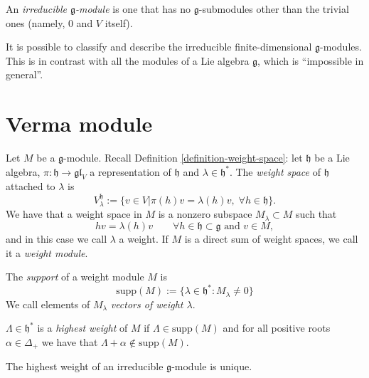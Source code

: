 \begin{definition}
\label{definition-irreducible-g-module}
An {\it irreducible $\mathfrak{g}$-module} is
one that has
no $\mathfrak{g}$-submodules other than the
trivial ones (namely, 0 and $V$ itself).
\end{definition}

It is possible to classify and describe the
irreducible finite-dimensional
$\mathfrak{g}$-modules. This is in contrast
with all the modules of a Lie algebra
$\mathfrak{g}$,
which is ``impossible in general''.

\section{Verma module}
\label{section-Verma-module}

Let $M$ be a $\mathfrak{g}$-module. Recall
Definition \ref{definition-weight-space}:
let $\mathfrak{h}$ be a Lie algebra,
$\pi:\mathfrak{h}\to\mathfrak{gl}_V$ a
representation of $\mathfrak{h}$
and $\lambda \in \mathfrak{h}^*$. The {\it
weight space} of $\mathfrak{h}$
attached to $\lambda$ is
$$
V_\lambda^{\mathfrak{h}}:=\{v \in
V|\pi(h)v=\lambda(h)v,\;
\forall h \in \mathfrak{h}\}.
$$
We have
that a weight space in $M$ is a nonzero
subspace
$M_\lambda \subset M$ such that
$$
hv=\lambda(h)v \qquad \forall h \in
\mathfrak{h}\subset\mathfrak{g}
\text{ and }v \in M,
$$
and in this case we call $\lambda$ a weight.
If $M$ is a direct sum of weight spaces, we
call it a {\it weight module}.

The {\it support} of a weight module $M$ is
\begin{equation}
\label{equation-support-of-weight-module}
\text{supp}(M):=\{\lambda \in
\mathfrak{h}^*:M_\lambda\neq 0\}
\end{equation}
We call elements of $M_\lambda$ {\it vectors
of weight $\lambda$}.

\begin{definition}
\label{definition-highest-weight}
$\Lambda \in \mathfrak{h}^*$ is a
{\it highest weight} of $M$
if $\Lambda \in \text{supp}(M)$
and for all positive roots $\alpha \in
\Delta_+$
we have that $\Lambda+\alpha
\not\in\text{supp}(M)$.
\end{definition}

\begin{exercise}
\label{exercise-highe-weigh-irred-g-modul}
The highest weight of an irreducible
$\mathfrak{g}$-module
is unique.
\end{exercise}

